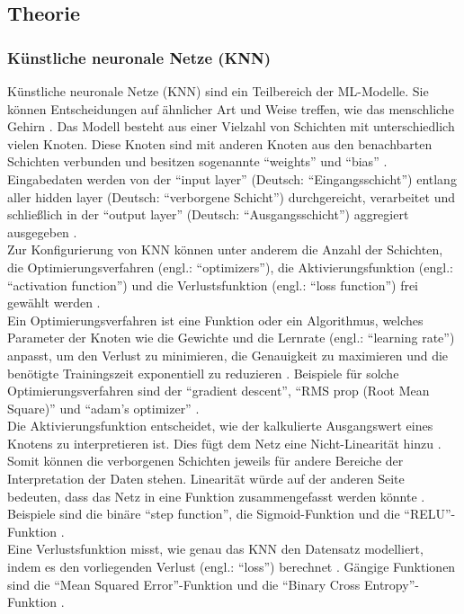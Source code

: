 \documentclass{scrartcl}
\begin{document}
\subsection{Theorie}

\subsubsection{Künstliche neuronale Netze (KNN)}
Künstliche neuronale Netze (KNN) sind ein Teilbereich der ML-Modelle. Sie können
Entscheidungen auf ähnlicher Art und Weise treffen, wie das menschliche Gehirn \cite{ibm}.
Das Modell besteht aus einer Vielzahl von Schichten mit unterschiedlich vielen
Knoten. Diese Knoten sind mit anderen Knoten aus den benachbarten Schichten verbunden
und besitzen sogenannte \enquote{weights} und \enquote{bias} \cite{ibm}.
Eingabedaten werden von der \enquote{input layer} (Deutsch: \enquote{Eingangsschicht})
entlang aller hidden layer (Deutsch: \enquote{verborgene Schicht}) durchgereicht,
verarbeitet und schließlich in der \enquote{output layer}
(Deutsch: \enquote{Ausgangsschicht}) aggregiert ausgegeben \cite{ibm}.
\medskip \\
Zur Konfigurierung von KNN können unter anderem die Anzahl der Schichten,
die Optimierungsverfahren (engl.: \enquote{optimizers}), die
Aktivierungsfunktion (engl.: \enquote{activation function}) und die
Verlustsfunktion (engl.: \enquote{loss function}) frei gewählt werden
\cite{actopt}.
\medskip \\
Ein Optimierungsverfahren ist eine Funktion oder ein Algorithmus, welches
Parameter der Knoten wie die Gewichte und die Lernrate (engl.: \enquote{learning rate})
anpasst, um den Verlust zu minimieren, die Genauigkeit zu maximieren und
die benötigte Trainingszeit exponentiell zu reduzieren \cite{actopt}.
Beispiele für solche Optimierungsverfahren sind der \enquote{gradient descent},
\enquote{RMS prop (Root Mean Square)} und \enquote{adam's optimizer} \cite{actopt}.
\smallskip \\
Die Aktivierungsfunktion entscheidet, wie der kalkulierte Ausgangswert
eines Knotens zu interpretieren ist. Dies fügt dem Netz eine Nicht-Linearität
hinzu \cite{actopt}. Somit können die verborgenen Schichten jeweils für
andere Bereiche der Interpretation der Daten stehen. Linearität würde auf
der anderen Seite bedeuten, dass das Netz in eine Funktion zusammengefasst
werden könnte \cite{actopt}. Beispiele sind die binäre \enquote{step function},
die Sigmoid-Funktion und die \enquote{RELU}-Funktion \cite{actopt}.
\smallskip \\
Eine Verlustsfunktion misst, wie genau das KNN den Datensatz modelliert, indem
es den vorliegenden Verlust (engl.: \enquote{loss}) berechnet \cite{actopt}.
Gängige Funktionen sind die \enquote{Mean Squared Error}-Funktion und die
\enquote{Binary Cross Entropy}-Funktion \cite{actopt}.
\end{document}

